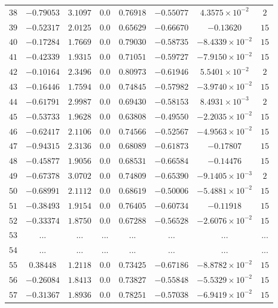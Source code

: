 \begin{landscape}
\begin{center}
\begin{longtable}{lccccccc}
$38$ & $-0.79053$ & $ 3.1097$ & $0.0$ & $ 0.76918$ & $-0.55077$ & $4.3575\times{}10^{-2}$ & $2$ \\
$39$ & $-0.52317$ & $ 2.0125$ & $0.0$ & $ 0.65629$ & $-0.66670$ & $-0.13620$ & $15$ \\
$40$ & $-0.17284$ & $ 1.7669$ & $0.0$ & $ 0.79030$ & $-0.58735$ & $-8.4339\times{}10^{-2}$ & $15$ \\
$41$ & $-0.42339$ & $ 1.9315$ & $0.0$ & $ 0.71051$ & $-0.59727$ & $-7.9150\times{}10^{-2}$ & $15$ \\
$42$ & $-0.10164$ & $ 2.3496$ & $0.0$ & $ 0.80973$ & $-0.61946$ & $5.5401\times{}10^{-2}$ & $2$ \\
$43$ & $-0.16446$ & $ 1.7594$ & $0.0$ & $ 0.74845$ & $-0.57982$ & $-3.9740\times{}10^{-2}$ & $15$ \\
$44$ & $-0.61791$ & $ 2.9987$ & $0.0$ & $ 0.69430$ & $-0.58153$ & $8.4931\times{}10^{-3}$ & $2$ \\
$45$ & $-0.53733$ & $ 1.9628$ & $0.0$ & $ 0.63808$ & $-0.49550$ & $-2.2035\times{}10^{-2}$ & $15$ \\
$46$ & $-0.62417$ & $ 2.1106$ & $0.0$ & $ 0.74566$ & $-0.52567$ & $-4.9563\times{}10^{-2}$ & $15$ \\
$47$ & $-0.94315$ & $ 2.3136$ & $0.0$ & $ 0.68089$ & $-0.61873$ & $-0.17807$ & $15$ \\
$48$ & $-0.45877$ & $ 1.9056$ & $0.0$ & $ 0.68531$ & $-0.66584$ & $-0.14476$ & $15$ \\
$49$ & $-0.67378$ & $ 3.0702$ & $0.0$ & $ 0.74809$ & $-0.65390$ & $-9.1405\times{}10^{-3}$ & $2$ \\
$50$ & $-0.68991$ & $ 2.1112$ & $0.0$ & $ 0.68619$ & $-0.50006$ & $-5.4881\times{}10^{-2}$ & $15$ \\
$51$ & $-0.38493$ & $ 1.9154$ & $0.0$ & $ 0.76405$ & $-0.60734$ & $-0.11918$ & $15$ \\
$52$ & $-0.33374$ & $ 1.8750$ & $0.0$ & $ 0.67288$ & $-0.56528$ & $-2.6076\times{}10^{-2}$ & $15$ \\
$53$ & ... & ... & ... & ... & ... & ... & ... \\
$54$ & ... & ... & ... & ... & ... & ... & ... \\
$55$ & $ 0.38448$ & $ 1.2118$ & $0.0$ & $ 0.73425$ & $-0.67186$ & $-8.8782\times{}10^{-2}$ & $15$ \\
$56$ & $-0.26084$ & $ 1.8413$ & $0.0$ & $ 0.73827$ & $-0.55848$ & $-5.5329\times{}10^{-2}$ & $15$ \\
$57$ & $-0.31367$ & $ 1.8936$ & $0.0$ & $ 0.78251$ & $-0.57038$ & $-6.9419\times{}10^{-2}$ & $15$ \\

\end{longtable}
\end{center}
\end{landscape}
